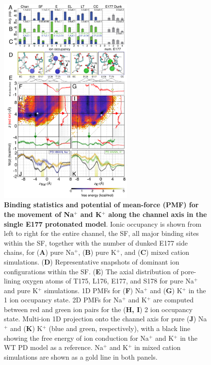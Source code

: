 \begin{refsection}
\begin{figure}[hp]
\centering
\includegraphics[width=0.6\textwidth]{nav2/Nav2Fig7}
\caption[Binding statistics and potential of mean-force (PMF) for the movement of Na$^+$ and K$^+$ along the channel axis in the single E177 protonated model]{\textbf{Binding statistics and potential of mean-force (PMF) for the movement of Na$^+$ and K$^+$ along the channel axis in the single E177 protonated model}. Ionic occupancy is shown from left to right for the entire channel, the SF, all major binding sites within the SF, together with the number of dunked E177 side chains, for (\textbf{A}) pure Na$^+$, (\textbf{B}) pure K$^+$, and (\textbf{C}) mixed cation simulations. (\textbf{D}) Representative snapshots of dominant ion configurations within the SF. (\textbf{E}) The axial distribution of pore-lining oxygen atoms of T175, L176, E177, and S178 for pure Na$^+$ and pure K$^+$ simulations. 1D PMFs for (\textbf{F}) Na$^+$ and (\textbf{G}) K$^+$ in the 1 ion occupancy state. 2D PMFs for Na$^+$ and K$^+$ are computed between red and green ion pairs for the (\textbf{H, I}) 2 ion occupancy state. Multi-ion 1D projection onto the channel axis for pure (\textbf{J}) Na$^+$ and (\textbf{K}) K$^+$ (blue and green, respectively), with a black line showing the free energy of ion conduction for Na$^+$ and K$^+$ in the WT PD model as a reference. Na$^+$ and K$^+$ in mixed cation simulations are shown as a gold line in both panels.}
\label{fig:nav2fig7}
\end{figure}


\end{refsection}
